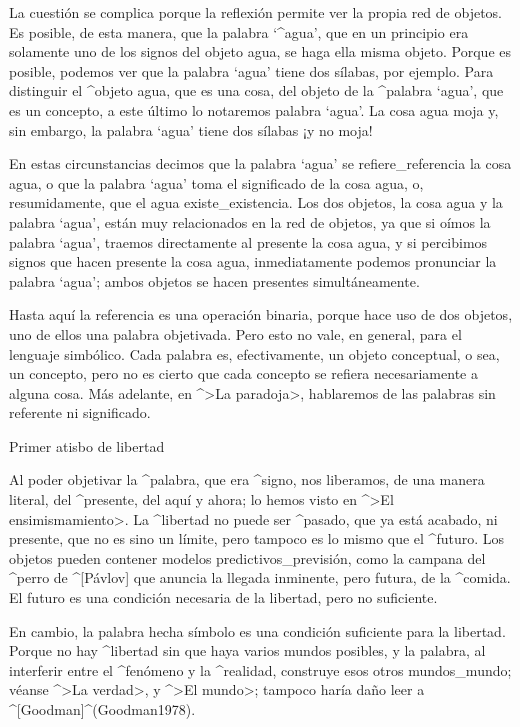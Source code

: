 La cuestión se complica porque la reflexión permite ver la propia red de
objetos. Es posible, de esta manera, que la palabra `^{agua}', que en un
principio era solamente uno de los signos del objeto agua, se haga ella
misma objeto. Porque es posible, podemos ver que la palabra `agua' tiene
dos sílabas, por ejemplo. Para distinguir el ^{objeto} agua, que es una
cosa, del objeto de la ^{palabra} `agua', que es un concepto, a este
último lo notaremos palabra `agua'. La cosa agua moja y, sin embargo, la
palabra `agua' tiene dos sílabas ¡y no moja!

En estas circunstancias decimos que la palabra `agua' se
refiere_{referencia} la cosa agua, o que la palabra `agua' toma el
significado de la cosa agua, o, resumidamente, que el agua
existe_{existencia}. Los dos objetos, la cosa agua y la palabra `agua',
están muy relacionados en la red de objetos, ya que si oímos la palabra
`agua', traemos directamente al presente la cosa agua, y si percibimos
signos que hacen presente la cosa agua, inmediatamente podemos
pronunciar la palabra `agua'; ambos objetos se hacen presentes
simultáneamente.

Hasta aquí la referencia es una operación binaria, porque hace uso de
dos objetos, uno de ellos una palabra objetivada. Pero esto no vale, en
general, para el lenguaje simbólico. Cada palabra es, efectivamente, un
objeto conceptual, o sea, un concepto, pero no es cierto que cada
concepto se refiera necesariamente a alguna cosa. Más adelante, en ^>La
paradoja>, hablaremos de las palabras sin referente ni significado.


\Section Primer atisbo de libertad

Al poder objetivar la ^{palabra}, que era ^{signo}, nos liberamos, de
una manera literal, del ^{presente}, del aquí y ahora; lo hemos visto en
^>El ensimismamiento>. La ^{libertad} no puede ser ^{pasado}, que ya
está acabado, ni presente, que no es sino un límite, pero tampoco es lo
mismo que el ^{futuro}. Los objetos pueden contener modelos
predictivos_{previsión}, como la campana del ^{perro} de ^[Pávlov] que
anuncia la llegada inminente, pero futura, de la ^{comida}. El futuro es
una condición necesaria de la libertad, pero no suficiente.

En cambio, la palabra hecha símbolo es una condición suficiente para la
libertad. Porque no hay ^{libertad} sin que haya varios mundos posibles,
y la palabra, al interferir entre el ^{fenómeno} y la ^{realidad},
construye esos otros mundos_{mundo}; véanse ^>La verdad>, y ^>El mundo>;
tampoco haría daño leer a ^[Goodman]^(Goodman1978).


